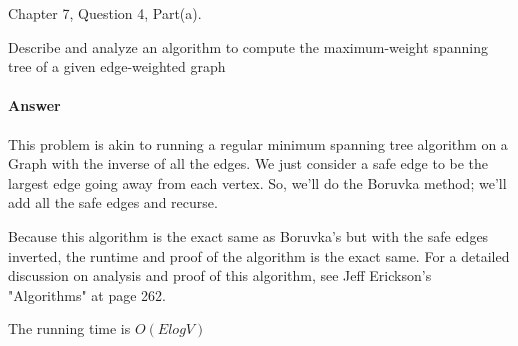 \documentclass{article}
\begin{document}
\collab{}

Chapter 7, Question 4, Part(a).

Describe and analyze an algorithm to compute the maximum-weight
spanning tree of a given edge-weighted graph

\paragraph{Answer}

This problem is akin to running a regular minimum spanning tree algorithm on
a Graph with the inverse of all the edges. We just consider a safe edge to be
the largest edge going away from each vertex. So, we'll do the Boruvka method;
we'll add all the safe edges and recurse.

Because this algorithm is the exact same as Boruvka's but with the safe edges inverted,
the runtime and proof of the algorithm is the exact same. For a detailed discussion
on analysis and proof of this algorithm, see Jeff Erickson's "Algorithms" at page 262.

The running time is $O(E log V)$
\end{document}
